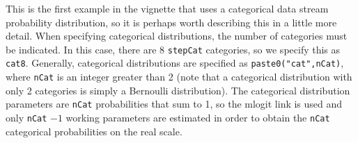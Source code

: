 \documentclass[12pt]{article}\usepackage[]{graphicx}\usepackage[]{color}
\begin{document}
\noindent This is the first example in the vignette that uses a categorical data stream probability distribution, so it is perhaps worth describing this in a little more detail. When specifying categorical distributions, the number of categories must be indicated. In this case, there are 8 \verb|stepCat| categories, so we specify this as \verb|cat8|. Generally, categorical distributions are specified as \verb|paste0("cat",nCat)|, where \verb|nCat| is an integer greater than 2 (note that a categorical distribution with only 2 categories is simply a Bernoulli distribution). The categorical distribution parameters are \verb|nCat| probabilities that sum to 1, so the mlogit link is used and only \verb|nCat| $-1$ working parameters are estimated in order to obtain the \verb|nCat| categorical probabilities on the real scale.
\end{document}
